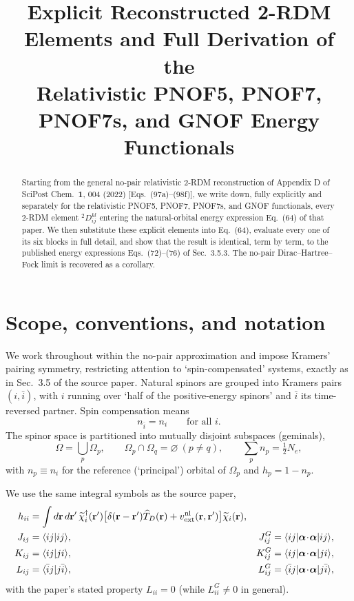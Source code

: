 \documentclass[11pt,a4paper]{article}
\title{Explicit Reconstructed 2-RDM Elements and Full Derivation of the\\
Relativistic PNOF5, PNOF7, PNOF7s, and GNOF Energy Functionals}
\author{}
\date{}
\newcommand{\Dtwo}{{}^2D}
\newcommand{\Om}{\Omega}
\begin{document}
\maketitle

\begin{abstract}
Starting from the general no-pair relativistic 2-RDM reconstruction of
Appendix D of SciPost Chem.\ \textbf{1}, 004 (2022) [Eqs.~(97a)--(98f)],
we write down, fully explicitly and separately for the relativistic
PNOF5, PNOF7, PNOF7s, and GNOF functionals, every 2-RDM element
$\Dtwo^{kl}_{ij}$ entering the natural-orbital energy expression
Eq.~(64) of that paper. We then substitute these explicit elements
into Eq.~(64), evaluate every one of its six blocks in full detail,
and show that the result is identical, term by term, to the published
energy expressions Eqs.~(72)--(76) of Sec.~3.5.3. The no-pair
Dirac--Hartree--Fock limit is recovered as a corollary.
\end{abstract}

\tableofcontents

\section{Scope, conventions, and notation}
\label{sec:scope}

We work throughout within the no-pair approximation and impose
Kramers' pairing symmetry, restricting attention to `spin-compensated'
systems, exactly as in Sec.~3.5 of the source paper. Natural spinors
are grouped into Kramers pairs $(i,\bar i)$, with $i$ running over
`half of the positive-energy spinors' and $\bar i$ its time-reversed
partner. Spin compensation means
\begin{equation}
 n_{\bar i}=n_i \qquad\text{for all } i.
 \label{eq:kramers-occ}
\end{equation}
The spinor space is partitioned into mutually disjoint subspaces
(geminals),
\begin{equation}
 \Om=\bigcup_p \Om_p, \qquad \Om_p\cap\Om_q=\varnothing \ (p\neq q),
 \qquad \sum_p n_p =\tfrac12 N_e ,
 \label{eq:partition}
\end{equation}
with $n_p\equiv n_i$ for the reference (`principal') orbital of
$\Om_p$ and $h_p=1-n_p$.

We use the same integral symbols as the source paper,
\begin{align}
 h_{ii}&=\int d\mathbf r\,d\mathbf r'\,\widetilde\chi_i^\dagger(\mathbf r')
 \big[\delta(\mathbf r-\mathbf r')\widehat T_D(\mathbf r)+v_{\rm ext}^{\rm nl}(\mathbf r,\mathbf r')\big]\widetilde\chi_i(\mathbf r),\\
 J_{ij}&=\langle ij|ij\rangle, &
 J^G_{ij}&=\langle ij|\bm\alpha\!\cdot\!\bm\alpha|ij\rangle,\\
 K_{ij}&=\langle ij|ji\rangle, &
 K^G_{ij}&=\langle ij|\bm\alpha\!\cdot\!\bm\alpha|ji\rangle,\\
 L_{ij}&=\langle \bar i j|j\bar i\rangle, &
 L^G_{ij}&=\langle \bar i j|\bm\alpha\!\cdot\!\bm\alpha|j\bar i\rangle,
\end{align}
with the paper's stated property $L_{ii}=0$ (while $L^G_{ii}\neq0$ in
general).
\end{document}
